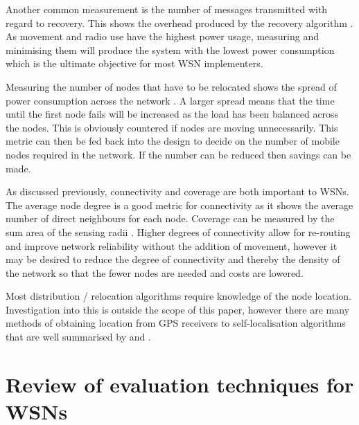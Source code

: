 \documentclass[authoryearcitations]{UoYCSproject}
\begin{document}
Another common measurement is the number of messages transmitted with regard to recovery. This shows the overhead produced by the recovery algorithm \citep{Abbasi2007}. As movement and radio use have the highest power usage, measuring and minimising them will produce the system with the lowest power consumption which is the ultimate objective for most WSN implementers.

Measuring the number of nodes that have to be relocated shows the spread of power consumption across the network \citep{Younis2010}. A larger spread means that the time until the first node fails will be increased as the load has been balanced across the nodes. This is obviously countered if nodes are moving unnecessarily.
This metric can then be fed back into the design to decide on the number of mobile nodes required in the network. If the number can be reduced then savings can be made.


As discussed previously, connectivity and coverage are both important to WSNs. The average node degree is a good metric for connectivity as it shows the average number of direct neighbours for each node. Coverage can be measured by the sum area of the sensing radii \citep{Joshi2012}. Higher degrees of connectivity allow for re-routing and improve network reliability without the addition of movement, however it may be desired to reduce the degree of connectivity and thereby the density of the network so that the fewer nodes are needed and costs are lowered.

%

Most distribution / relocation algorithms require knowledge of the node location. Investigation into this is outside the scope of this paper, however there are many methods of obtaining location from GPS receivers to self-localisation algorithms that are well summarised by \citet*{Hu2004} and \citet*{Mao2007}.

\section{Review of evaluation techniques for WSNs}
\label{sec:simReview}

\end{document}
